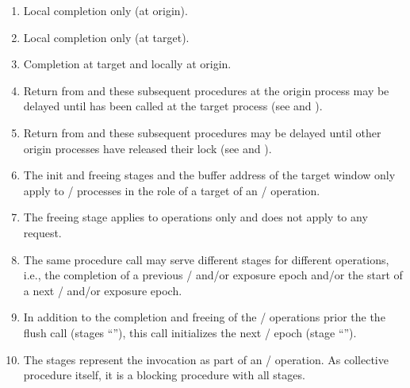 {\begin{enumerate}
\item \label{semantics:item31} Local completion only (at origin).
\item \label{semantics:item32} Local completion only (at target).
\item \label{semantics:item33} Completion at target and locally at origin.
\item \label{semantics:item34} Return from  and these
  subsequent procedures at the origin process may be delayed until 
  has been called at the target process (see 
  and ).
\item \label{semantics:item35} Return from  and these
  subsequent procedures may be delayed until other origin processes have released
  their lock (see  and ).
\item \label{semantics:item36} The init and freeing stages and the buffer address of
  the target window only apply to \mpi/ processes in the role of a target of an \RMA/ operation.
\item \label{semantics:item37} The freeing stage applies to operations only
  and does not apply to any request.
\item \label{semantics:item38} The same procedure call may serve different
  stages for different operations, i.e.,
  the completion of a previous \RMA/ and/or exposure epoch and/or
  the start of a next \RMA/ and/or exposure epoch.
\item \label{semantics:item39} In addition to the completion and freeing of
  the \RMA/ operations prior the the flush call (stages ``''),
  this call initializes the next \RMA/ epoch (stage ``'').
\item \label{semantics:item40} The stages represent the invocation as part of an \RMA/ operation.
  As collective procedure itself, it is a blocking procedure with all stages.
\end{enumerate}
}

